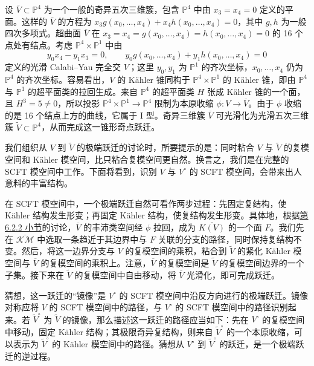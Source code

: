 \begin{example}\label{ex:quintic-conifold-transition}
设 $\overline V\subset\mathbb P^4$ 为一个一般的奇异五次三维簇，包含 $\mathbb P^4$ 中由 $x_3=x_4=0$ 定义的平面。这样的 $\overline V$ 的方程为
$x_3g(x_0,\ldots,x_4)+x_4h(x_0,\ldots,x_4)=0$，其中 $g,h$ 为一般四次多项式。超曲面 $\overline V$ 在 $x_3=x_4=g(x_0,\ldots,x_4)=h(x_0,\ldots,x_4)=0$ 的 16 个点处有结点。考虑 $\mathbb P^4\times\mathbb P^1$ 中由
\[
y_0x_4-y_1x_3=0,\qquad
y_0g(x_0,\ldots,x_4)+y_1h(x_0,\ldots,x_4)=0
\]
定义的光滑 Calabi--Yau 完全交 $V$；这里 $y_0,y_1$ 为 $\mathbb P^1$ 的齐次坐标，$x_0,\ldots,x_4$ 仍为 $\mathbb P^4$ 的齐次坐标。容易看出，$V$ 的 Kähler 锥同构于 $\mathbb P^4\times\mathbb P^1$ 的 Kähler 锥，即由 $\mathbb P^4$ 与 $\mathbb P^1$ 的超平面类的拉回生成。来自 $\mathbb P^4$ 的超平面类 $H$ 张成 Kähler 锥的一个面，且 $H^3=5\ne0$，所以投影 $\mathbb P^4\times\mathbb P^1\to\mathbb P^4$ 限制为本原收缩 $\phi:V\to\overline V$。由于 $\phi$ 收缩的是 16 个结点上方的曲线，它属于 I 型。奇异三维簇 $\overline V$ 可光滑化为光滑五次三维簇 $\widetilde V\subset\mathbb P^4$，从而完成这一锥形奇点跃迁。
\end{example}

我们组织从 $V$ 到 $\widetilde V$ 的极端跃迁的讨论时，所要提示的是：同时粘合 $V$ 与 $\widetilde V$ 的复模空间和 Kähler 模空间，比只粘合复模空间更自然。换言之，我们是在完整的 SCFT 模空间中工作。下面将看到，识别 $V$ 与 $V^\circ$ 的 SCFT 模空间，会带来出人意料的丰富结构。

在 SCFT 模空间中，一个极端跃迁自然可看作两步过程：先固定复结构，使 Kähler 结构发生形变；再固定 Kähler 结构，使复结构发生形变。具体地，根据\hyperref[subsec:threefold-kahler-moduli]{第 6.2.2 小节}的讨论，$\overline V$ 的丰沛类空间经 $\phi$ 拉回，成为 $\overline{K(V)}$ 的一个面 $F$。我们先在 $\overline{\mathcal{KM}}$ 中选取一条趋近于其边界中与 $F$ 关联的分支的路径，同时保持复结构不变。然后，将这一边界分支与 $V$ 的复模空间的乘积，粘合到 $\widetilde V$ 的紧化 Kähler 模空间与 $\overline V$ 的复模空间的乘积上。注意，$\overline V$ 的复模空间是 $\widetilde V$ 的复模空间边界的一个子集。接下来在 $\widetilde V$ 的复模空间中自由移动，将 $\overline V$ 光滑化，即可完成跃迁。

 猜想，这一跃迁的“镜像”是 $V^\circ$ 的 SCFT 模空间中沿反方向进行的极端跃迁。镜像对称应将 $V$ 的 SCFT 模空间中的路径，与 $V^\circ$ 的 SCFT 模空间中的路径识别起来。若 $\widetilde V^\circ$ 为 $\widetilde V$ 的镜像，那么描述这一跃迁的路径应当如下：先在 $V^\circ$ 的复模空间中移动，固定 Kähler 结构；其极限奇异复结构，则来自 $\widetilde V^\circ$ 的一个本原收缩，可以表示为 $\widetilde V^\circ$ 的 Kähler 模空间中的路径。猜想从 $V^\circ$ 到 $\widetilde V^\circ$ 的跃迁，是一个极端跃迁的逆过程。

